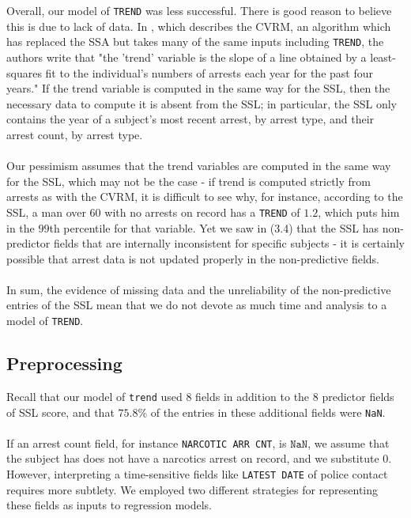 %
%
%
Overall, our model of \texttt{TREND} was less successful. There is good reason to believe this is due to lack of data. In \cite{factsheet}, which describes the CVRM, an algorithm which has replaced the SSA but takes many of the same inputs including \texttt{TREND}, the authors write that "the 'trend' variable is the slope of a line obtained by a least-squares fit to the individual’s numbers of arrests each year for the past four years." If the trend variable is computed in the same way for the SSL, then the necessary data to compute it is absent from the SSL; in particular, the SSL only contains the year of a subject's most recent arrest, by arrest type, and their arrest count, by arrest type.\\\\
Our pessimism assumes that the trend variables are computed in the same way for the SSL, which may not be the case - if trend is computed strictly from arrests as with the CVRM, it is difficult to see why, for instance, according to the SSL, a man over 60 with no arrests on record has a \texttt{TREND} of $1.2$, which puts him in the $99$th percentile for that variable. Yet we saw in (3.4) that the SSL has non-predictor fields that are internally inconsistent for specific subjects - it is certainly possible that arrest data is not updated properly in the non-predictive fields.\\\\
In sum, the evidence of missing data and the unreliability of the non-predictive entries of the SSL mean that we do not devote as much time and analysis to a model of \texttt{TREND}.
\subsection{Preprocessing}
Recall that our model of \texttt{trend} used 8 fields in addition to the 8 predictor fields of SSL score, and that $75.8$\% of the entries in these additional fields were \texttt{NaN}.\\\\
If an arrest count field, for instance \texttt{NARCOTIC ARR CNT}, is $\texttt{NaN}$, we assume that the subject has does not have a narcotics arrest on record, and we substitute $0$. However, interpreting a time-sensitive fields like \texttt{LATEST DATE} of police contact requires more subtlety. We employed two different strategies for representing these fields as inputs to regression models.
